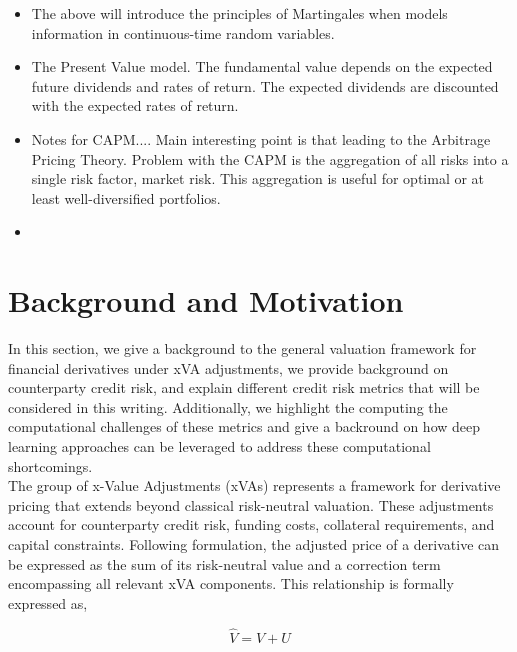 \begin{itemize}
        \item The above will introduce the principles of Martingales when models information in continuous-time random variables. 
        \item The Present Value model. The fundamental value depends on the expected future dividends and rates of return. The expected dividends are discounted with the expected rates of return. 
        \item Notes for CAPM.... Main interesting point is that leading to the Arbitrage Pricing Theory. Problem with the CAPM is the aggregation of all risks into a single risk factor, market risk. This aggregation is useful for optimal or at least well-diversified
        portfolios.  
        \item 
    \end{itemize}
   

\chapter{Background and Motivation}
    In this section, we give a background to the general valuation framework for financial derivatives under xVA adjustments, we provide background on counterparty credit risk, and explain different credit risk metrics that will be considered in this writing. Additionally, we highlight the computing the computational challenges of these metrics and give a backround on how deep learning approaches can be leveraged to address these computational shortcomings. \\
    
\noindent
    The group of x-Value Adjustments (xVAs) represents a framework for derivative pricing that extends beyond classical risk-neutral valuation. These adjustments account for counterparty credit risk, funding costs, collateral requirements, and capital constraints. Following \cite{Green_2016} formulation, the adjusted price of a derivative can be expressed as the sum of its risk-neutral value and a correction term encompassing all relevant xVA components. This relationship is formally expressed as,
    
    \begin{equation}\label{eq:xva-general}
        \hat{V} = V + U
    \end{equation}


